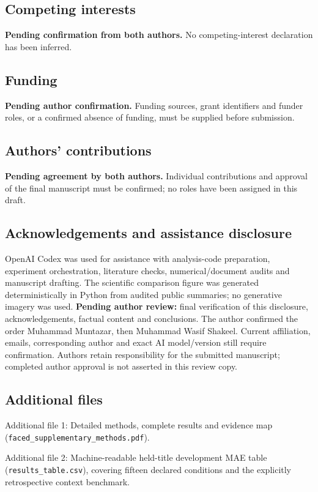\documentclass[11pt,a4paper]{article}
\begin{document}
\subsection*{Competing interests}
\textbf{Pending confirmation from both authors.} No competing-interest declaration has been inferred.

\subsection*{Funding}
\textbf{Pending author confirmation.} Funding sources, grant identifiers and funder roles, or a confirmed absence of funding, must be supplied before submission.

\subsection*{Authors' contributions}
\textbf{Pending agreement by both authors.} Individual contributions and approval of the final manuscript must be confirmed; no roles have been assigned in this draft.

\subsection*{Acknowledgements and assistance disclosure}
OpenAI Codex was used for assistance with analysis-code preparation, experiment orchestration, literature checks, numerical/document audits and manuscript drafting. The scientific comparison figure was generated deterministically in Python from audited public summaries; no generative imagery was used. \textbf{Pending author review:} final verification of this disclosure, acknowledgements, factual content and conclusions. The author confirmed the order Muhammad Muntazar, then Muhammad Wasif Shakeel. Current affiliation, emails, corresponding author and exact AI model/version still require confirmation. Authors retain responsibility for the submitted manuscript; completed author approval is not asserted in this review copy.

\subsection*{Additional files}
Additional file 1: Detailed methods, complete results and evidence map (\nolinkurl{faced_supplementary_methods.pdf}).

Additional file 2: Machine-readable held-title development MAE table (\texttt{results\_table.csv}), covering fifteen declared conditions and the explicitly retrospective context benchmark.



\end{document}
